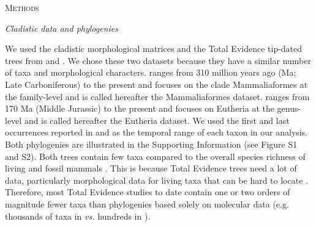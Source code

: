 \documentclass[12pt,letterpaper]{article}
\renewcommand{\section}[1]{%
\bigskip
\begin{center}
\begin{Large}
\normalfont\scshape #1
\medskip
\end{Large}
\end{center}}
\renewcommand{\subsection}[1]{%
\bigskip
\begin{center}
\begin{large}
\normalfont\itshape #1
\end{large}
\end{center}}
\begin{document}
%
%

\section{Methods}

\subsection{Cladistic data and phylogenies}
We used the cladistic morphological matrices and the Total Evidence tip-dated trees \citep{ronquista2012} from \citet[][103 taxa with 446 morphological characters;]{Slater2012MEE} and \citet[][102 taxa with 421 morphological characters]{beckancient2014}.
We chose these two datasets because they have a similar number of taxa and morphological characters.
\cite{Slater2012MEE} ranges from 310 million years ago (Ma; Late Carboniferous) to the present and focuses on the clade Mammaliaformes at the family-level and is called hereafter the Mammaliaformes dataset.
\cite{beckancient2014} ranges from 170 Ma (Middle Jurassic) to the present and focuses on Eutheria at the genus-level and is called hereafter the Eutheria dataset.
We used the first and last occurrences reported in \cite{Slater2012MEE} and \cite{beckancient2014} as the temporal range of each taxon in our analysis.
Both phylogenies are illustrated in the Supporting Information (see Figure S1 and S2).
Both trees contain few taxa compared to the overall species richness of living and fossil mammals \citep{bininda2007delayed,archibald2011extinction}.
This is because Total Evidence trees need a lot of data, particularly morphological data for living taxa that can be hard to locate \citep{GuillermeCooper}.
Therefore, most Total Evidence studies to date contain one or two orders of magnitude fewer taxa than phylogenies based solely on molecular data (e.g. thousands of taxa in \citealt{bininda2007delayed,meredithimpacts2011} \textit{vs.} hundreds in \citealt{ronquista2012,Slater2012MEE,Wood01032013,beckancient2014}).
\end{document}
